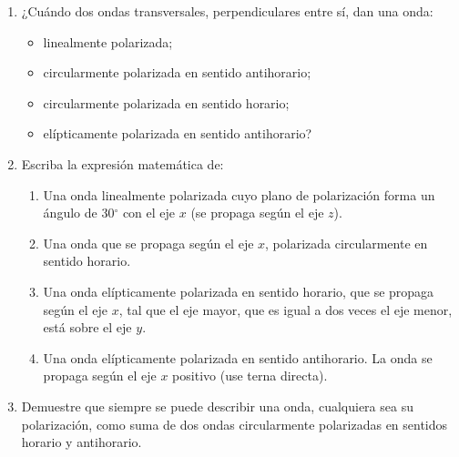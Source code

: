 \documentclass[11pt,spanish]{article}
\begin{document}
\begin{enumerate}


\section*{Estados de polarización}


    \item ¿Cuándo dos ondas transversales, perpendiculares entre sí, dan una
    onda:

    \begin{itemize}
        \item linealmente polarizada;
        \item circularmente polarizada en sentido antihorario;
        \item circularmente polarizada en sentido horario;
        \item elípticamente polarizada en sentido antihorario? 
    \end{itemize}
    
    
    \item Escriba la expresión matemática de:

    \begin{enumerate}
        \item Una onda linealmente polarizada cuyo plano de polarización forma
        un ángulo de 30$^{\circ}$ con el eje $x$ (se propaga según el eje $z$).

        \item Una onda que se propaga según el eje $x$, polarizada circularmente
        en sentido horario.

        \item Una onda elípticamente polarizada en sentido horario, que se
        propaga según el eje $x$, tal que el eje mayor, que es igual a dos veces
        el eje menor, está sobre el eje $y$.

        \item Una onda elípticamente polarizada en sentido antihorario. La onda
        se propaga según el eje $x$ positivo (use terna directa). 
    \end{enumerate}


    \item Demuestre que siempre se puede describir una onda, cualquiera sea
    su polarización, como suma de dos ondas circularmente polarizadas
    en sentidos horario y antihorario.



\end{enumerate}
\end{document}
